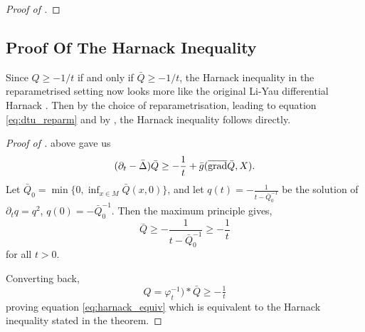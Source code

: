 \documentclass{amsart}
\begin{document}
\begin{proof}[Proof of ]

\end{proof}

\subsection{Proof Of The Harnack Inequality}
\label{subsec:harnack_proof}

Since \(Q \geq -1/t\) if and only if \(\bar{Q} \geq -1/t\), the Harnack inequality in the reparametrised setting now looks more like the original Li-Yau differential Harnack \cite{LiYau:/1986}. Then by the choice of reparametrisation, leading to equation \eqref{eq:dtu_reparm} and by , the Harnack inequality follows directly.

\begin{proof}[Proof of ]
 above gave us
\[
(\partial_t - \bar{\Delta}) \bar{Q} \geq - \frac{1}{t} + \bar{g}(\overline{\operatorname{grad}} \bar{Q}, X).
\]
Let \(\bar{Q}_0 = \min\{0, \inf_{x\in M} \bar{Q}(x, 0)\}\), and let \(q(t) = -\tfrac{1}{t - \bar{Q}_0^{-1}}\) be the solution of \(\partial_t q = q^2\), \(q(0) = -\bar{Q}_0^{-1}\). Then the maximum principle gives,
\[
\bar{Q} \geq -\frac{1}{t - \bar{Q}_0^{-1}} \geq -\frac{1}{t}
\]
for all \(t > 0\).

Converting back,
\[
Q = \varphi_t^{-1}){\ast} \bar{Q} \geq -\tfrac{1}{t}
\]
proving equation \eqref{eq:harnack_equiv} which is equivalent to the Harnack inequality stated in the theorem.
\end{proof}
\end{document}
